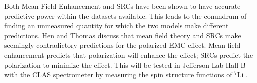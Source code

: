 Both Mean Field Enhancement and SRCs have been shown to have accurate predictive power within the datasets available. This leads to the conundrum of finding an unmeasured quantity for which the two models make different predictions. Hen \cite{HenSRC} and Thomas \cite{ThomasSRC} discuss that mean field theory and SRCs make seemingly contradictory predictions for the polarized EMC effect. Mean field enhancement predicts that polarization will enhance the effect; SRCs predict the polarization to minimize the effect. This will be tested in Jefferson Lab Hall B with the CLAS spectrometer by measuring the spin structure functions of $^7$Li \cite{CLASspinEMC}.